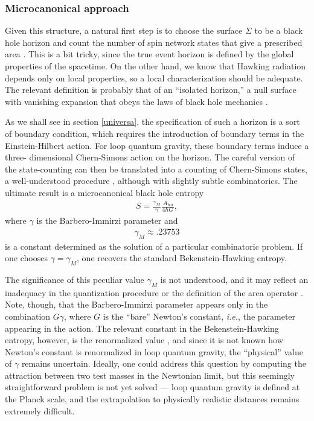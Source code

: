 \documentclass[12pt]{article}
\begin{document}
\subsubsection{Microcanonical approach}

Given this structure, a natural first step is to choose the surface
$\Sigma$ to be a black hole horizon and count the number of spin 
network states that give a prescribed area \cite{Krasnov,Rovellib}.   
This is a bit tricky, since the true event horizon  is 
defined by the global properties of the spacetime.  On the other hand, 
we know that Hawking radiation depends only on local
properties, so a local characterization
should be adequate.  The relevant definition is probably that of an
``isolated horizon,'' a null surface with vanishing expansion that
obeys the laws of black hole mechanics \cite{Ashisol,Ashisolb}.

As we shall see in section \ref{universa}, the specification
of such a horizon is a sort of boundary condition, which requires 
the introduction of boundary terms in the Einstein-Hilbert action.
For loop quantum gravity, these boundary terms induce a three-%
dimensional Chern-Simons action on the horizon.  The careful 
version of the state-counting \cite{ABCK,ABK} can then be
translated into a counting of Chern-Simons states, a well-understood
procedure \cite{Witten_Jones}, although with slightly subtle 
combinatorics.  The ultimate result is a microcanonical  black hole 
entropy \cite{Domagala,Meissner}
\begin{align}
S = \frac{\gamma_M}{\gamma}
  \frac{\ A_{\mathrm{\scriptstyle hor}}}{4\hbar G} ,
\label{Carlipg6}
\end{align}
where $\gamma$ is the Barbero-Immirzi parameter and
\begin{align}
\gamma_M \approx .23753
\label{Carlipg7}
\end{align}
is a constant determined as the solution of a particular
combinatoric problem.  If one chooses $\gamma=\gamma_M$, 
one recovers the standard Bekenstein-Hawking entropy.  

The significance of this peculiar value $\gamma_M$ is not 
understood, and it may reflect an inadequacy in the quantization 
procedure or the definition of the area operator \cite{Alexandrov}.  
Note, though, that the Barbero-Immirzi parameter appears only
in the combination $G\gamma$, where $G$ is the ``bare''
Newton's constant, \emph{i.e.}, the parameter appearing in the action.
The relevant constant in the Bekenstein-Hawking entropy, however,
is the renormalized value \cite{Jacobsone}, and since it is not known
how Newton's constant is renormalized in loop quantum gravity,
the ``physical'' value of $\gamma$ remains uncertain.
Ideally, one could address this question by computing the attraction
between two test masses in the Newtonian limit, but this seemingly
straightforward problem is not yet solved --- loop quantum gravity
is defined at the Planck scale, and the extrapolation to
physically realistic distances remains extremely difficult.
\end{document}
